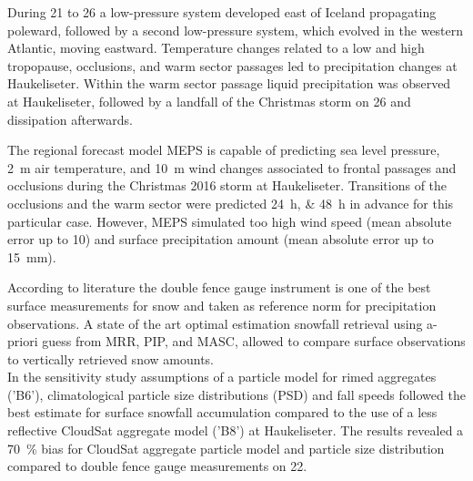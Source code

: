 During \num{21} to \SI{26}{\dec} a low-pressure system developed east of Iceland propagating poleward, followed by a second low-pressure system, which evolved in the western Atlantic, moving eastward.
Temperature changes related to a low and high tropopause, occlusions, and warm sector passages led to precipitation changes %
at Haukeliseter. 
Within the warm sector passage liquid precipitation was observed at Haukeliseter, followed by a landfall of the Christmas storm on \SI{26}{\dec} and dissipation afterwards. 
\par\medskip
\noindent
The regional forecast model MEPS is capable of predicting sea level pressure, \SI{2}{\metre} air temperature, and \SI{10}{\metre} wind changes associated to frontal passages and occlusions during the Christmas 2016 storm at Haukeliseter. 
Transitions of the occlusions and the warm sector were predicted \SIlist{24;48}{\hour} in advance for this particular case.
However, MEPS simulated too high wind speed (mean absolute error up to \SI{10}{\mPs}) and surface precipitation amount (mean absolute error up to \SI{15}{\mm}).
\par\medskip
\noindent
According to literature the double fence gauge instrument is  one of the best surface measurements for snow and taken as reference norm for precipitation observations. 
A state of the art optimal estimation snowfall retrieval using a-priori guess from MRR, PIP, and MASC, allowed to compare surface observations to vertically retrieved snow amounts. 
\\
In the sensitivity study assumptions of a particle model for rimed aggregates ('B6'), climatological particle size distributions (PSD) and fall speeds followed the best estimate for surface snowfall accumulation compared to the use of a less reflective CloudSat aggregate model ('B8') 
at Haukeliseter. 
The results revealed a \SI{70}{\percent} bias for CloudSat aggregate particle model and particle size distribution compared to double fence gauge measurements on \SI{22}{\dec}.
